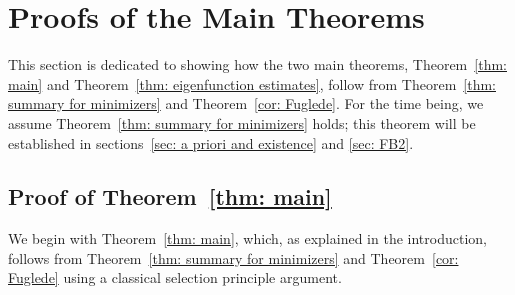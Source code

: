 \documentclass[10pt, reqno]{amsart}
\numberwithin{equation}{section}
\begin{document}
  
 
\section{Proofs of the Main Theorems}\label{sec: proofs of main theorems}
This section is dedicated to showing how the two main theorems, Theorem~\ref{thm: main} and Theorem~\ref{thm: eigenfunction estimates}, follow from Theorem~\ref{thm: summary for minimizers} and Theorem~\ref{cor: Fuglede}. For the time being, we assume Theorem~\ref{thm: summary for minimizers} holds; this theorem will be established in sections~\ref{sec: a priori and existence} and \ref{sec: FB2}. 

\subsection{Proof of Theorem~\ref{thm: main}}\label{ssec: proof of main}
We begin with Theorem~\ref{thm: main}, which, as explained in the introduction, follows from Theorem~\ref{thm: summary for minimizers} and Theorem~\ref{cor: Fuglede} using a classical selection principle argument.
\end{document}
